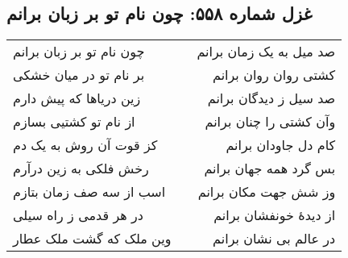 \begin{center}
\section*{غزل شماره ۵۵۸: چون نام تو بر زبان برانم}
\label{sec:558}
\begin{longtable}{l p{0.5cm} r}
چون نام تو بر زبان برانم
&&
صد میل به یک زمان برانم
\\
بر نام تو در میان خشکی
&&
کشتی روان روان برانم
\\
زین دریاها که پیش دارم
&&
صد سیل ز دیدگان برانم
\\
از نام تو کشتیی بسازم
&&
وآن کشتی را چنان برانم
\\
کز قوت آن روش به یک دم
&&
کام دل جاودان برانم
\\
رخش فلکی به زین درآرم
&&
بس گرد همه جهان برانم
\\
اسب از سه صف زمان بتازم
&&
وز شش جهت مکان برانم
\\
در هر قدمی ز راه سیلی
&&
از دیدهٔ خونفشان برانم
\\
وین ملک که گشت ملک عطار
&&
در عالم بی نشان برانم
\\
\end{longtable}
\end{center}
